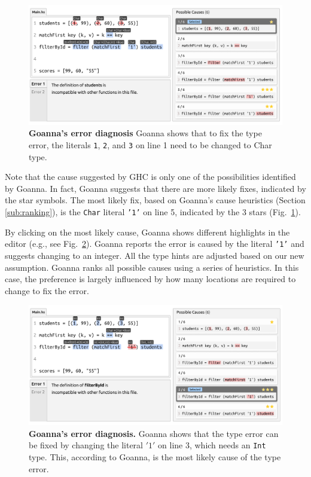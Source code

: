 \documentclass[pdflatex,sn-mathphys-num]{sn-jnl}%
\begin{document}
    \begin{figure}[ht!]
        \centering
        \includegraphics[width=\linewidth]{images/Goanna-Example-1}
        \caption[Goanna's showing possible causes of a type error (1)]{\textbf{Goanna's error diagnosis} Goanna shows that to fix the type error, the literals \texttt{1}, \texttt{2}, and \texttt{3} on line 1 need to be changed to Char type.}
        \label{fig:goanna-example-1}
    \end{figure}


    Note that the cause suggested by GHC is only one of the possibilities identified by Goanna. In fact, Goanna suggests that there are more likely fixes, indicated by the star symbols. The most likely fix, based on Goanna's cause heuristics (Section \ref{sub:ranking}), is the \texttt{Char} literal \texttt{'1'} on line 5, indicated by the 3 stars (Fig.~\ref{fig:goanna-example-1}).
    
    
    By clicking on the most likely cause, Goanna shows different highlights in the editor (e.g., see Fig.~\ref{fig:goanna-example-2}). Goanna reports the error is caused by the literal \texttt{'1'} and suggests changing to an integer. All the type hints are adjusted based on our new assumption. Goanna ranks all possible causes using a series of heuristics. In this case, the preference is largely influenced by how many locations are required to change to fix the error. 
    
    \begin{figure}[ht!]
        \centering
        \includegraphics[width=\linewidth]{images/goanna-example-2}
        \caption[Goanna's showing possible causes of a type error (2)]{\textbf{Goanna's error diagnosis.} Goanna shows that the type error can be fixed by changing the literal $'1'$ on line 3, which needs an \texttt{Int} type. This, according to Goanna, is the most likely cause of the type error.}
        \label{fig:goanna-example-2}
    \end{figure}
\end{document}
